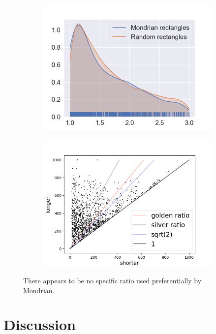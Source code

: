 \documentclass[serif,article,noparskip]{agse-thesis}
\begin{document}
\begin{figure}
\centering
\begin{subfigure}{.5\textwidth}
  \includegraphics[width=\linewidth]{images/aspect-max-min-rects.png}
  \caption{ }
  \label{fig:aspect-rects}
\end{subfigure}%
\begin{subfigure}{.5\textwidth}
  \centering
  \includegraphics[width=\linewidth]{images/longer-x-shorter.png}
  \caption{ }
  \label{fig:longer-x-shorter}
\end{subfigure}
\caption{There appears to be no specific ratio used preferentially by Mondrian.}
\end{figure}


\section{Discussion} \label{conclusion}
\end{document}
